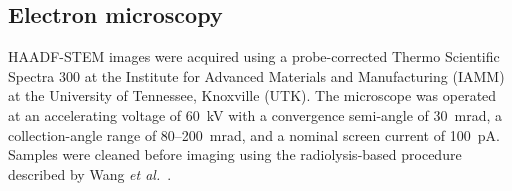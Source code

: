 \subsection{Electron microscopy}

HAADF-STEM images were acquired using a probe-corrected Thermo Scientific Spectra 300 at the Institute for Advanced Materials and Manufacturing (IAMM) at the University of Tennessee, Knoxville (UTK). The microscope was operated at an accelerating voltage of 60~kV with a convergence semi-angle of 30~mrad, a collection-angle range of 80--200~mrad, and a nominal screen current of 100~pA. Samples were cleaned before imaging using the radiolysis-based procedure described by Wang \textit{et al.}~\cite{Wang2024}.
